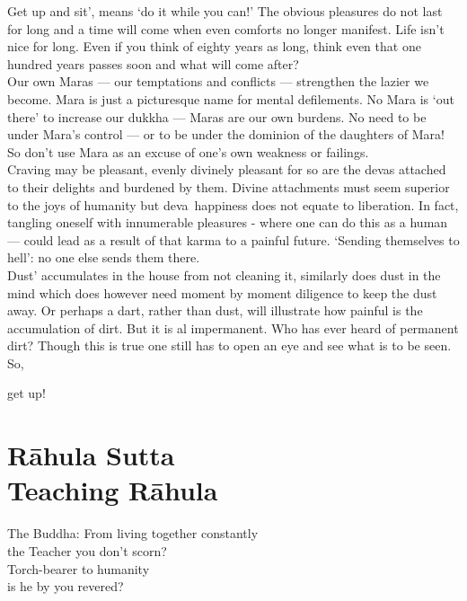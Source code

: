 Get up and sit', means `do it while you can!' The obvious pleasures do not last for long and a time will come when even comforts no longer manifest. Life isn't nice for long. Even if you think of eighty years as long, think even that one hundred years passes soon and what will come after?\\

Our own Maras — our temptations and conflicts — strengthen the lazier we become. Mara is just a picturesque name for mental defilements. No Mara is `out there' to increase our dukkha — Maras are our own burdens. No need to be under Mara's control — or to be under the dominion of the daughters of Mara! So don't use Mara as an excuse of one's own weakness or failings.\\

Craving may be pleasant, evenly divinely pleasant for so are the devas attached to their delights and burdened by them. Divine attachments must seem superior to the joys of humanity but deva~happiness does not equate to liberation. In fact, tangling oneself with innumerable pleasures - where one can do this as a human — could lead as a result of that karma to a painful future. `Sending themselves to hell': no one else sends them there.\\

Dust' accumulates in the house from not cleaning it, similarly does dust in the mind which does however need moment by moment diligence to keep the dust away. Or perhaps a dart, rather than dust, will illustrate how painful is the accumulation of dirt. But it is al impermanent. Who has ever heard of permanent dirt? Though this is true one still has to open an eye and see what is to be seen. So,
\begin{MyDescription}[]{}
get up!
\end{MyDescription}

\chapter{R\=ahula Sutta\\ Teaching R\=ahula}

\begin{MyDescription}{The Buddha:}
From living together constantly\\
the Teacher you don't scorn?\\
Torch-bearer to humanity\\
is he by you revered?
\end{MyDescription}

